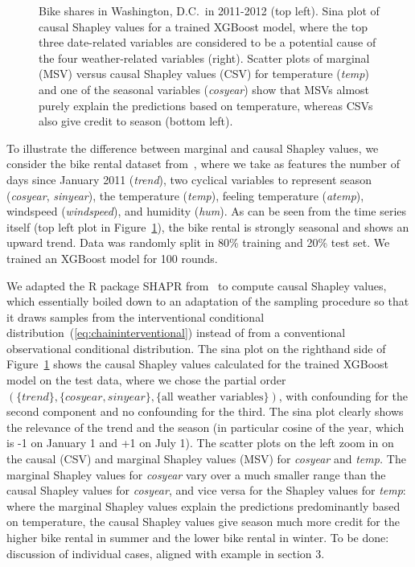 \documentclass{article}
\newcommand{\comment}[1]{{\color{red} #1}}
\begin{document}
\begin{figure}[t]
\begin{minipage}{.5\linewidth}
	\end{minipage}
	\caption{Bike shares in Washington, D.C.\ in 2011-2012 (top left). Sina plot of causal Shapley values for a trained XGBoost model, where the top three date-related variables are considered to be a potential cause of the four weather-related variables (right). Scatter plots of marginal (MSV) versus causal Shapley values (CSV) for temperature ({\em temp}) and one of the seasonal variables ({\em cosyear}) show that MSVs almost purely explain the predictions based on temperature, whereas CSVs also give credit to season (bottom left).}
	\label{fig:trendplot}
\end{figure}

To illustrate the difference between marginal and causal Shapley values, we consider the bike rental dataset from~\cite{fanaee2013bikerental}, where we take as features the number of days since January 2011 ({\em trend}), two cyclical variables to represent season ({\em cosyear}, {\em sinyear}), the temperature ({\em temp}), feeling temperature ({\em atemp}), windspeed ({\em windspeed}), and humidity ({\em hum}). As can be seen from the time series itself (top left plot in Figure~\ref{fig:trendplot}), the bike rental is strongly seasonal and shows an upward trend. Data was randomly split in 80\% training and 20\% test set. We trained an XGBoost model for 100 rounds. 

We adapted the R package SHAPR from~\cite{aas2019explaining} to compute causal Shapley values, which essentially boiled down to an adaptation of the sampling procedure so that it draws samples from the interventional conditional distribution~(\ref{eq:chaininterventional}) instead of from a conventional observational conditional distribution. The sina plot on the righthand side of Figure~\ref{fig:trendplot} shows the causal Shapley values calculated for the trained XGBoost model on the test data, where we chose the partial order $(\{\textit{trend}\},\{\textit{cosyear},\textit{sinyear}\},\{\textrm{all weather variables}\})$, with confounding for the second component and no confounding for the third. The sina plot clearly shows the relevance of the trend and the season (in particular cosine of the year, which is -1 on January 1 and +1 on July 1). The scatter plots on the left zoom in on the causal (CSV) and marginal Shapley values (MSV) for {\em cosyear} and {\em temp.} The marginal Shapley values for {\em cosyear} vary over a much smaller range than the causal Shapley values for {\em cosyear}, and vice versa for the Shapley values for {\em temp}: where the marginal Shapley values explain the predictions predominantly based on temperature, the causal Shapley values give season much more credit for the higher bike rental in summer and the lower bike rental in winter. \comment{To be done: discussion of individual cases, aligned with example in section 3.}
\end{document}
